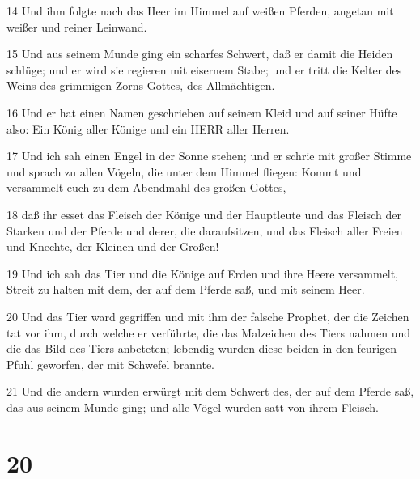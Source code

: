\par 14 Und ihm folgte nach das Heer im Himmel auf weißen Pferden, angetan mit weißer und reiner Leinwand.
\par 15 Und aus seinem Munde ging ein scharfes Schwert, daß er damit die Heiden schlüge; und er wird sie regieren mit eisernem Stabe; und er tritt die Kelter des Weins des grimmigen Zorns Gottes, des Allmächtigen.
\par 16 Und er hat einen Namen geschrieben auf seinem Kleid und auf seiner Hüfte also: Ein König aller Könige und ein HERR aller Herren.
\par 17 Und ich sah einen Engel in der Sonne stehen; und er schrie mit großer Stimme und sprach zu allen Vögeln, die unter dem Himmel fliegen: Kommt und versammelt euch zu dem Abendmahl des großen Gottes,
\par 18 daß ihr esset das Fleisch der Könige und der Hauptleute und das Fleisch der Starken und der Pferde und derer, die daraufsitzen, und das Fleisch aller Freien und Knechte, der Kleinen und der Großen!
\par 19 Und ich sah das Tier und die Könige auf Erden und ihre Heere versammelt, Streit zu halten mit dem, der auf dem Pferde saß, und mit seinem Heer.
\par 20 Und das Tier ward gegriffen und mit ihm der falsche Prophet, der die Zeichen tat vor ihm, durch welche er verführte, die das Malzeichen des Tiers nahmen und die das Bild des Tiers anbeteten; lebendig wurden diese beiden in den feurigen Pfuhl geworfen, der mit Schwefel brannte.
\par 21 Und die andern wurden erwürgt mit dem Schwert des, der auf dem Pferde saß, das aus seinem Munde ging; und alle Vögel wurden satt von ihrem Fleisch.

\chapter{20}

